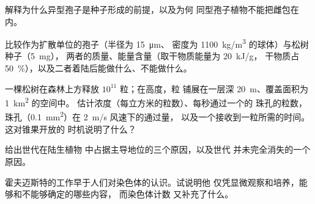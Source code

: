 \begin{exercise}[$\star\star$]\label{exo:b2:plant-life-cycles:8}
解释为什么异型孢子是种子形成的前提，以及为何
同型孢子植物不能把雌包在
内。
\end{exercise}

\begin{exercise}[$\star\star$]\label{exo:b2:plant-life-cycles:9}
比较作为扩散单位的孢子（半径为 \qty{15}{\micro m}、
密度为 \qty{1100}{kg/m^3} 的球体）与松树种子（\qty{5}{mg}），
两者的质量、能量含量（取干物质能量为 \qty{20}{kJ/g}，
干物质占 \qty{50}{\%}），以及二者着陆后能做什么、不能做什么。
\end{exercise}

\begin{exercise}[$\star\star\star$]\label{exo:b2:plant-life-cycles:10}
一棵松树在森林上方释放 $10^{11}$ 粒；在高度，粒
铺展在一层深 \qty{20}{m}、覆盖面积为 \qty{1}{km^2} 的空间中。
估计浓度（每立方米的粒数）、每秒通过一个的
珠孔的粒数，
珠孔（\qty{0.1}{mm^2}）在 \qty{2}{m/s} 风速下的通过量，
以及一个接收到一粒所需的时间。这对锥果开放的
时机说明了什么？
\end{exercise}

\begin{exercise}[$\star\star\star$]\label{exo:b2:plant-life-cycles:11}
给出世代在陆生植物
中占据主导地位的三个原因，以及世代
并未完全消失的一个原因。
\end{exercise}

\begin{exercise}[$\star\star\star$]\label{exo:b2:plant-life-cycles:12}
霍夫迈斯特的工作早于人们对染色体的认识。试说明他
仅凭显微观察和培养，能够和不能够确定的哪些内容，
而染色体计数
又补充了什么。
\end{exercise}

